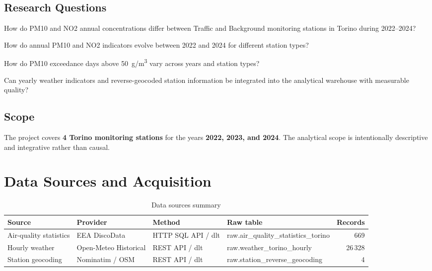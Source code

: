 \documentclass[11pt,a4paper]{article}
\begin{document}
\subsection{Research Questions}

\begin{tcolorbox}[rqbox,title=RQ1 --- Descriptive]
How do PM10 and NO2 annual concentrations differ between Traffic and Background monitoring
stations in Torino during 2022--2024?
\end{tcolorbox}
\begin{tcolorbox}[rqbox,title=RQ2 --- Temporal]
How do annual PM10 and NO2 indicators evolve between 2022 and 2024 for different station types?
\end{tcolorbox}
\begin{tcolorbox}[rqbox,title=RQ3 --- Exceedance analysis]
How do PM10 exceedance days above 50~\textmu g/m\textsuperscript{3} vary across years and station types?
\end{tcolorbox}
\begin{tcolorbox}[rqbox,title=RQ4 --- Integration and enrichment quality]
Can yearly weather indicators and reverse-geocoded station information be integrated into the
analytical warehouse with measurable quality?
\end{tcolorbox}

\subsection{Scope}

The project covers \textbf{4 Torino monitoring stations} for the years \textbf{2022, 2023, and 2024}.
The analytical scope is intentionally descriptive and integrative rather than causal.

\section{Data Sources and Acquisition}

\begin{table}[h!]
\centering
\caption{Data sources summary}
\small
\begin{tabularx}{\textwidth}{@{}llllr@{}}
\toprule
\textbf{Source} & \textbf{Provider} & \textbf{Method} & \textbf{Raw table} & \textbf{Records} \\
\midrule
Air-quality statistics & EEA DiscoData         & HTTP SQL API / dlt & raw.air\_quality\_statistics\_torino & 669 \\
Hourly weather         & Open-Meteo Historical & REST API / dlt     & raw.weather\_torino\_hourly          & 26\,328 \\
Station geocoding      & Nominatim / OSM       & REST API / dlt     & raw.station\_reverse\_geocoding      & 4 \\
\bottomrule
\end{tabularx}
\end{table}
\end{document}
